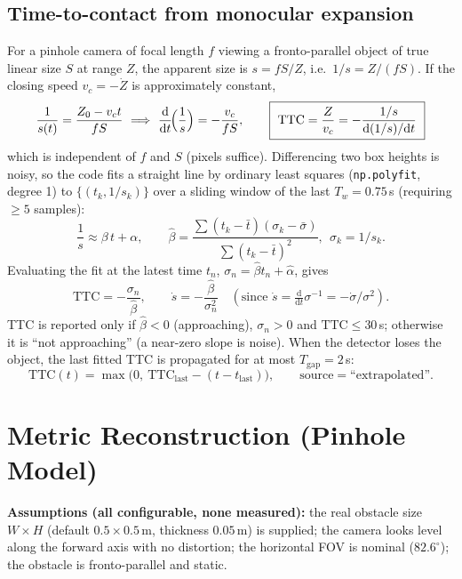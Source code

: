 \documentclass[11pt,a4paper]{article}
\newcommand{\dd}{\mathrm{d}}
\newcommand{\code}[1]{\texttt{\small #1}}
\newcommand{\hatv}[1]{\widehat{#1}}
\begin{document}
\subsection{Time-to-contact from monocular expansion}
For a pinhole camera of focal length $f$ viewing a fronto-parallel object of true linear size $S$ at range $Z$,
the apparent size is $s=fS/Z$, i.e.\ $1/s=Z/(fS)$. If the closing speed $v_c=-\dot Z$ is approximately constant,
\begin{equation}
\frac1{s(t)}=\frac{Z_0-v_ct}{fS}\ \Longrightarrow\ \frac{\dd}{\dd t}\!\Bigl(\frac1s\Bigr)=-\frac{v_c}{fS},
\qquad
\boxed{\ \text{TTC}=\frac{Z}{v_c}=-\frac{1/s}{\dd(1/s)/\dd t}\ }
\label{eq:ttc}
\end{equation}
which is independent of $f$ and $S$ (pixels suffice). Differencing two box heights is noisy, so the code fits a straight line by
ordinary least squares (\code{np.polyfit}, degree 1) to $\{(t_k,1/s_k)\}$ over a sliding window of the last $T_w=0.75$\,s
(requiring $\ge5$ samples):
\[
\frac1{s}\approx\beta\,t+\alpha,\qquad \hatv{\beta}=\frac{\sum(t_k-\bar t)(\sigma_k-\bar\sigma)}{\sum(t_k-\bar t)^2},\ \ \sigma_k=1/s_k.
\]
Evaluating the fit at the latest time $t_n$, $\sigma_n=\hatv\beta t_n+\hatv\alpha$, gives
\begin{equation}
\text{TTC}=-\frac{\sigma_n}{\hatv\beta},\qquad
\dot s=-\frac{\hatv\beta}{\sigma_n^{2}}\quad(\text{since }\dot s=\tfrac{\dd}{\dd t}\sigma^{-1}=-\dot\sigma/\sigma^{2}).
\end{equation}
TTC is reported only if $\hatv\beta<0$ (approaching), $\sigma_n>0$ and $\text{TTC}\le30$\,s; otherwise it is ``not approaching'' (a near-zero slope is noise).
When the detector loses the object, the last fitted TTC is propagated for at most $T_{\text{gap}}=2$\,s:
\begin{equation}
\text{TTC}(t)=\max\bigl(0,\ \text{TTC}_{\text{last}}-(t-t_{\text{last}})\bigr),\qquad \text{source}=\text{``extrapolated''}.
\end{equation}

\section{Metric Reconstruction (Pinhole Model)}
\textbf{Assumptions (all configurable, none measured):} the real obstacle size $W\times H$ (default $0.5\times0.5$\,m, thickness $0.05$\,m) is supplied;
the camera looks level along the forward axis with no distortion; the horizontal FOV is nominal ($82.6^\circ$); the obstacle is fronto-parallel and static.
\end{document}
